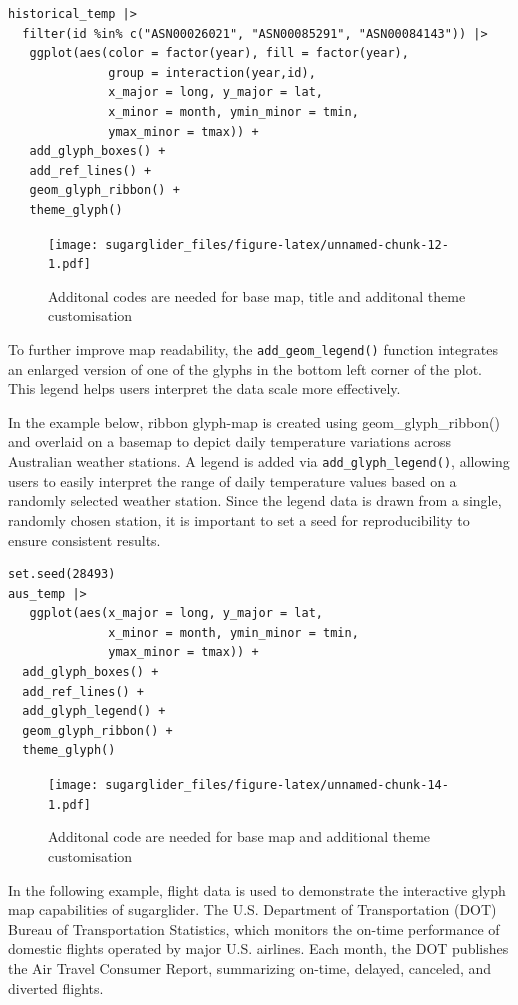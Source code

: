 \begin{verbatim}
historical_temp |> 
  filter(id %in% c("ASN00026021", "ASN00085291", "ASN00084143")) |>
   ggplot(aes(color = factor(year), fill = factor(year),
              group = interaction(year,id),
              x_major = long, y_major = lat,
              x_minor = month, ymin_minor = tmin, 
              ymax_minor = tmax)) +
   add_glyph_boxes() +
   add_ref_lines() +
   geom_glyph_ribbon() +
   theme_glyph()
\end{verbatim}

\begin{figure}
\centering
\texttt{[image: sugarglider\_files/figure-latex/unnamed-chunk-12-1.pdf]}
\caption{\label{fig:unnamed-chunk-12}Additonal codes are needed for base map, title and additonal theme customisation}
\end{figure}

To further improve map readability, the \texttt{add\_geom\_legend()} function integrates an enlarged version of one of the glyphs in the bottom left corner of the plot. This legend helps users interpret the data scale more effectively.

In the example below, ribbon glyph-map is created using geom\_glyph\_ribbon() and overlaid on a basemap to depict daily temperature variations across Australian weather stations. A legend is added via \texttt{add\_glyph\_legend()}, allowing users to easily interpret the range of daily temperature values based on a randomly selected weather station. Since the legend data is drawn from a single, randomly chosen station, it is important to set a seed for reproducibility to ensure consistent results.

\begin{verbatim}
set.seed(28493)
aus_temp |>
   ggplot(aes(x_major = long, y_major = lat,
              x_minor = month, ymin_minor = tmin,
              ymax_minor = tmax)) +
  add_glyph_boxes() +
  add_ref_lines() +
  add_glyph_legend() +
  geom_glyph_ribbon() +
  theme_glyph() 
\end{verbatim}

\begin{figure}
\centering
\texttt{[image: sugarglider\_files/figure-latex/unnamed-chunk-14-1.pdf]}
\caption{\label{fig:unnamed-chunk-14}Additonal code are needed for base map and additional theme customisation}
\end{figure}

In the following example, flight data is used to demonstrate the interactive glyph map capabilities of sugarglider. The U.S. Department of Transportation (DOT) Bureau of Transportation Statistics, which monitors the on-time performance of domestic flights operated by major U.S. airlines. Each month, the DOT publishes the Air Travel Consumer Report, summarizing on-time, delayed, canceled, and diverted flights.

